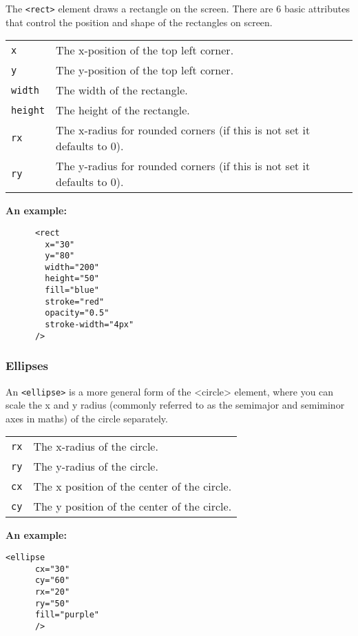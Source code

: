 \documentclass[english,11pt,a4paper]{report}
\begin{document}
 The \verb|<rect>| element draws a rectangle on the screen. There are 6 basic attributes that control the position and shape of the rectangles on screen. 
 \begin{center}
 \begin{tabular}{l|p{15cm}}
\verb|x| & The x-position of the top left corner. \\
\verb|y| & The y-position of the top left corner. \\
\verb|width| & The width of the rectangle. \\
\verb|height| & The height of the rectangle.  \\
\verb|rx| & The x-radius for rounded corners (if this is not set it defaults to 0). \\
\verb|ry| & The y-radius for rounded corners (if this is not set it defaults to 0).
\end{tabular}
\end{center}

{\bf An example:}
\begin{multicols}{2}
\begin{lstlisting}
      <rect
        x="30"
        y="80"
        width="200"
        height="50"
        fill="blue"
        stroke="red"
        opacity="0.5"
        stroke-width="4px"
      />
\end{lstlisting}
\columnbreak

\end{multicols}


\newpage
\subsubsection{Ellipses}

An \verb|<ellipse>| is a more general form of the <circle> element, where you can scale the x and y radius (commonly referred to as the semimajor and semiminor axes in maths) of the circle separately.
\begin{center}
\begin{tabular}{l|p{15cm}}
\verb|rx| & The x-radius of the circle. \\
\verb|ry| & The y-radius of the circle. \\
\verb|cx| & The x position of the center of the circle. \\
\verb|cy| & The y position of the center of the circle. 
\end{tabular}
\end{center}

{\bf An example:}
\begin{multicols}{2}
\begin{lstlisting}
<ellipse 
      cx="30"
      cy="60"
      rx="20"
      ry="50"
      fill="purple"
      />
\end{lstlisting}
\columnbreak

\end{multicols}
\end{document}
